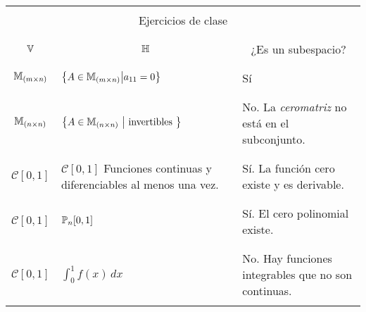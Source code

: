 \begin{center}
    \begin{tabular}{ ||c||p{5cm}||p{4.5cm}|| }
        \hline
        \hline
        \multicolumn{3}{||c||}{} \\
        \multicolumn{3}{||c||}{Ejercicios de clase} \\
        \multicolumn{3}{||c||}{} \\
        \hline
        \hline
        
        & & \\
        \multicolumn{1}{||c||}{$\mathbb{V}$} & \multicolumn{1}{|c||}{$\mathbb{H}$} & \multicolumn{1}{|c||}{¿Es un subespacio?} \\
        & & \\
        
        \hline
        \hline
        
        & & \\
        $\mathbb{M}_{(m \times n)}$ & $\left\{ A \in \mathbb{M}_{(m \times n)} \middle|a_{11} =  0 \right\}$ & Sí \\
        & & \\
        
        \hline
        
        & & \\
        $\mathbb{M}_{(n \times n)}$ & $\left\{ A \in \mathbb{M}_{(n \times n)} \ \middle| \ \text{invertibles } \right\}$ & No. La \textit{ceromatriz} no está en el subconjunto. \\
        & & \\
        
        \hline
        
        & & \\
        $\mathcal{C}\left[ 0, 1 \right]$ & $\mathcal{C}\left[ 0, 1 \right]$ Funciones continuas y diferenciables al menos una vez. & Sí. La función cero existe y es derivable. \\
        & & \\
        
        \hline
        
        & & \\
        $\mathcal{C}\left[ 0, 1 \right]$ & $\mathbb{P}_n[0, 1]$ & Sí. El cero polinomial existe. \\
        & & \\
        
        \hline
        
        & & \\
        $\mathcal{C}\left[ 0, 1 \right]$ & $\int_0^1 f(x) \, dx$ & No. Hay funciones integrables que no son continuas. \\
        & & \\
        
        \hline
        \hline
    \end{tabular}
\end{center}

